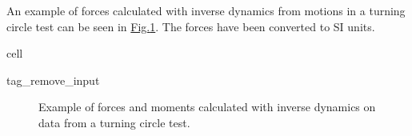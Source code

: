 \documentclass[review]{elsarticle}
\begin{document}
\sphinxAtStartPar
An example of forces calculated with inverse dynamics from motions in a turning circle test can be seen in \hyperref[\detokenize{03.01_inverse_dynamics:fig-inverse}]{Fig.\@ \ref{\detokenize{03.01_inverse_dynamics:fig-inverse}}}. The forces have been converted to SI units.

\begin{sphinxuseclass}{cell}
\begin{sphinxuseclass}{tag_remove_input}
\end{sphinxuseclass}
\end{sphinxuseclass}
\begin{figure}[H]
\centering
\capstart

\noindent{}
\caption{Example of forces and moments calculated with inverse dynamics on data from a turning circle test.}\label{\detokenize{03.01_inverse_dynamics:fig-inverse}}\end{figure}
\end{document}
